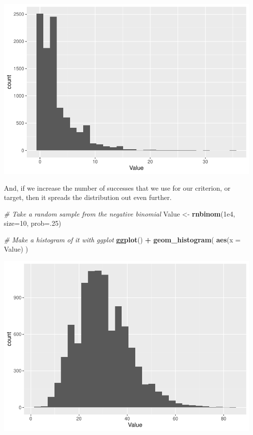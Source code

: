 \documentclass[
]{book}
\newenvironment{Shaded}{\begin{snugshade}}{\end{snugshade}}
\newcommand{\CommentTok}[1]{\textcolor[rgb]{0.56,0.35,0.01}{\textit{#1}}}
\newcommand{\DataTypeTok}[1]{\textcolor[rgb]{0.13,0.29,0.53}{#1}}
\newcommand{\DecValTok}[1]{\textcolor[rgb]{0.00,0.00,0.81}{#1}}
\newcommand{\FloatTok}[1]{\textcolor[rgb]{0.00,0.00,0.81}{#1}}
\newcommand{\KeywordTok}[1]{\textcolor[rgb]{0.13,0.29,0.53}{\textbf{#1}}}
\newcommand{\NormalTok}[1]{#1}
\newcommand{\OperatorTok}[1]{\textcolor[rgb]{0.81,0.36,0.00}{\textbf{#1}}}
\newcommand{\StringTok}[1]{\textcolor[rgb]{0.31,0.60,0.02}{#1}}
\begin{document}
\includegraphics{worstr_files/figure-latex/unnamed-chunk-140-1.pdf}

And, if we increase the number of successes that we use for our criterion, or target, then it spreads the distribution out even further.

\begin{Shaded}
\begin{Highlighting}[]
\CommentTok{# Take a random sample from the negative binomial}
\NormalTok{Value <-}\StringTok{ }\KeywordTok{rnbinom}\NormalTok{(}\FloatTok{1e4}\NormalTok{, }\DataTypeTok{size=}\DecValTok{10}\NormalTok{, }\DataTypeTok{prob=}\NormalTok{.}\DecValTok{25}\NormalTok{)}

\CommentTok{# Make a histogram of it with ggplot}
\KeywordTok{ggplot}\NormalTok{() }\OperatorTok{+}\StringTok{ }\KeywordTok{geom_histogram}\NormalTok{( }\KeywordTok{aes}\NormalTok{(}\DataTypeTok{x =}\NormalTok{ Value) )}
\end{Highlighting}
\end{Shaded}

\includegraphics{worstr_files/figure-latex/unnamed-chunk-141-1.pdf}
\end{document}
